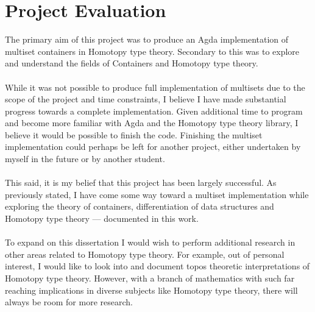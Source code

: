 \documentclass[12pt]{report}
\begin{document}
\section{Project Evaluation}
The primary aim of this project was to produce an Agda implementation of multiset containers in Homotopy type theory. Secondary to this was to explore and understand the fields of Containers and Homotopy type theory.\\
\\
While it was not possible to produce full implementation of multisets due to the scope of the project and time constraints, I believe I have made substantial progress towards a complete implementation. Given additional time to program and become more familiar with Agda and the Homotopy type theory library, I believe it would be possible to finish the code. Finishing the multiset implementation could perhaps be left for another project, either undertaken by myself in the future or by another student.\\
\\
 This said, it is my belief that this project has been largely successful. As previously stated, I have come some way toward a multiset implementation while exploring the theory of containers, differentiation of data structures and Homotopy type theory --- documented in this work.\\
\\
To expand on this dissertation I would wish to perform additional research in other areas related to Homotopy type theory. For example, out of personal interest, I would like to look into and document topos theoretic interpretations of Homotopy type theory. However, with a branch of mathematics with such far reaching implications in diverse subjects like Homotopy type theory, there will always be room for more research.

\newpage
\end{document}
